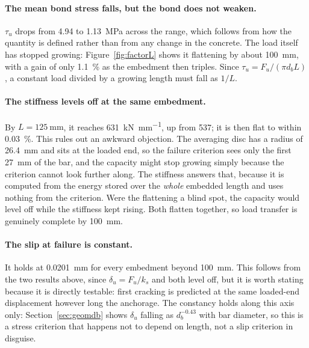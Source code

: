 \paragraph{The mean bond stress falls, but the bond does not weaken.}
$\tau_u$ drops from \SI{4.94}{} to \SI{1.13}{\mega\pascal} across the
range, which follows from how the quantity is defined rather than from any
change in the concrete. The load itself has stopped growing:
Figure~\ref{fig:factorL} shows it flattening by about
\SI{100}{\milli\metre}, with a gain of only \SI{1.1}{\percent} as the
embedment then triples. Since $\tau_u = F_u/(\pi d_b L)$, a constant
load divided by a growing length must fall as $1/L$.

\paragraph{The stiffness levels off at the same embedment.}
By $L = \SI{125}{\milli\metre}$, it reaches
\SI{631}{\kilo\newton\per\milli\metre}, up from \SI{537}{}; it is then flat to within
\SI{0.03}{\percent}. This rules out an awkward objection. The averaging
disc has a radius of \SI{26.4}{\milli\metre} and sits at the loaded end, so
the failure criterion sees only the first \SI{27}{\milli\metre} of the bar,
and the capacity might stop growing simply because the criterion cannot
look further along. The stiffness answers that, because it is computed from
the energy stored over the \emph{whole} embedded length and uses nothing
from the criterion. Were the
flattening a blind spot, the capacity would level off while the stiffness
kept rising. Both flatten together, so load transfer is genuinely complete
by \SI{100}{\milli\metre}.

\paragraph{The slip at failure is constant.}
It holds at \SI{0.0201}{\milli\metre} for every embedment beyond
\SI{100}{\milli\metre}. This follows from the two results above, since
$\delta_u = F_u/k_s$ and both level off, but it is worth stating because it
is directly testable: first cracking is predicted at the same loaded-end
displacement however long the anchorage. The constancy holds along this
axis only: Section~\ref{sec:geomdb} shows $\delta_u$ falling as
$d_b^{-0.43}$ with bar diameter, so this is a stress criterion that
happens not to depend on length, not a slip criterion in disguise.

